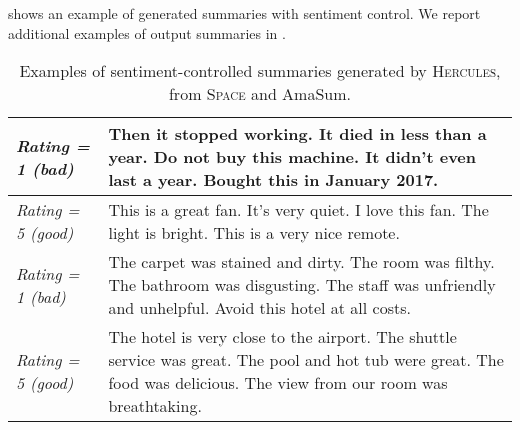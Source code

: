 \documentclass[11pt]{article}
\newcommand\Tstrut{\rule{0pt}{2.6ex}}         \newcommand\Bstrut{\rule[-1.6ex]{0pt}{0pt}}
\begin{document}
 shows an example of generated summaries with sentiment control. We report additional examples of output summaries in .

 
\begin{table*}[ht]
\renewcommand{\arraystretch}{1.2}
    \centering
    \small
    \begin{tabular}{@{}m{2.5cm}@{~}|@{~}m{12.5cm}@{}}
    \hline\hline
\textit{Rating = 1 (bad)} & \Tstrut Then it stopped working. It died in less than a year. Do not buy this machine. It didn't even last a year. Bought this in January 2017. \\
\hline
\textit{Rating = 5 (good)} & This is a great fan. It's very quiet. I love this fan. The light is bright. This is a very nice remote. \Bstrut \\
\hline\hline
  \textit{Rating = 1 (bad)} &  \Tstrut The carpet was stained and dirty. The room was filthy. The bathroom was disgusting. The staff was unfriendly and unhelpful. Avoid this hotel at all costs. \\
\hline
\textit{Rating = 5 (good) } & The hotel is very close to the airport. The shuttle service was great. The pool and hot tub were great. The food was delicious. The view from our room was breathtaking. \Bstrut \\
\hline\hline
    \end{tabular}
\caption{Examples of sentiment-controlled summaries generated by \textsc{Hercules}, from \textsc{Space} and AmaSum.}
\label{tab:sentiment}
\end{table*}
\end{document}
